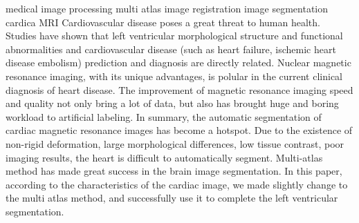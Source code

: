 
\begin{Eabstract}%
{medical image processing}%
{multi atlas}%
{image registration}%
{image segmentation}%
{cardica MRI}
  Cardiovascular disease poses a great threat to human health.
  Studies have shown that left ventricular morphological structure
  and functional abnormalities and cardiovascular disease
  (such as heart failure, ischemic heart disease embolism)
  prediction and diagnosis are directly related.
  Nuclear magnetic resonance imaging,  with its unique advantages,
  is polular in the current clinical diagnosis of heart disease.
  The improvement of magnetic resonance imaging speed and quality
  not only bring a lot of data,
  but also has brought huge and boring workload to artificial labeling.
  In summary, 
  the automatic segmentation of cardiac magnetic resonance images
  has become a hotspot.
  Due to the existence of non-rigid deformation,
  large morphological differences,
  low tissue contrast,
  poor imaging results,
  the heart is difficult to automatically segment.
  Multi-atlas method has made great success in the brain image segmentation.
  In this paper, according to the characteristics of the cardiac image,
  we made slightly change to the multi atlas method,
  and successfully use it to complete the left ventricular segmentation.
\end{Eabstract}
